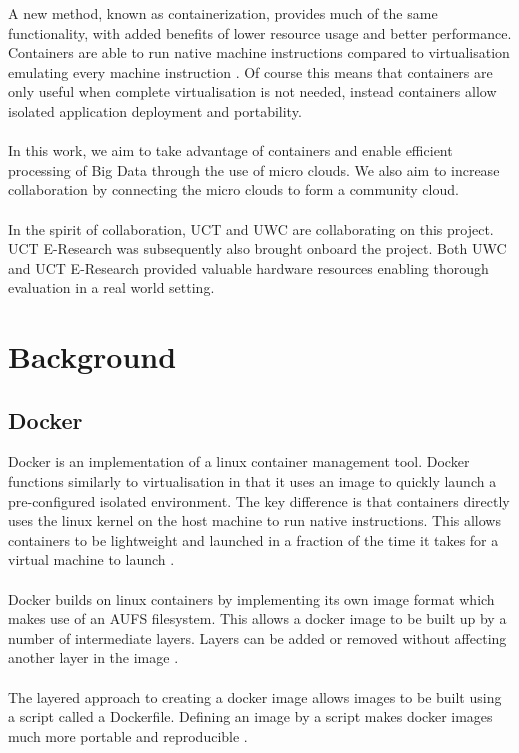 \documentclass{sig-alternate-05-2015}
\begin{document}
A new method, known as containerization, provides much of the same functionality, with added benefits of lower resource usage and better performance. Containers are able to run native machine instructions compared to virtualisation emulating every machine instruction \cite{dua2014virtualization}. Of course this means that containers are only useful when complete virtualisation is not needed, instead containers allow isolated application deployment and portability.
\\\\
In this work, we aim to take advantage of containers and enable efficient processing of Big Data through the use of micro clouds. We also aim to increase collaboration by connecting the micro clouds to form a community cloud.
\\\\
In the spirit of collaboration, UCT and UWC are collaborating on this project. UCT E-Research was subsequently also brought onboard the project. Both UWC and UCT E-Research provided valuable hardware resources enabling thorough evaluation in a real world setting.


\section{Background}

\subsection{Docker}
Docker is an implementation of a linux container management tool. Docker functions similarly to virtualisation in that it uses an image to quickly launch a pre-configured isolated environment. The key difference is that containers directly uses the linux kernel on the host machine to run native instructions. This allows containers to be lightweight and launched in a fraction of the time it takes for a virtual machine to launch \cite{boettiger2014introduction}. 
\\\\
Docker builds on linux containers by implementing its own image format which makes use of an AUFS filesystem. This allows a docker image to be built up by a number of intermediate layers. Layers can be added or removed without affecting another layer in the image \cite{felter2014updated}.
\\\\
The layered approach to creating a docker image allows images to be built using a script called a Dockerfile. Defining an image by a script makes docker images much more portable and reproducible \cite{boettiger2014introduction}.
\end{document}
